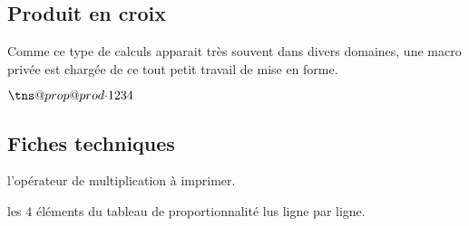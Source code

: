 \documentclass[12pt,a4paper]{article}
\begin{document}

\subsection{Produit en croix}

Comme ce type de calculs apparait très souvent dans divers domaines, une macro privée est chargée de ce tout petit travail de mise en forme.

\begin{latexex}
\makeatletter
$\tns@prop@prod{\cdot} %
               {1}{2}  %
               {3}{4}$ %
\makeatother
\end{latexex}




\subsection{Fiches techniques}



 l'opérateur de multiplication à imprimer.

 les $4$ éléments du tableau de proportionnalité lus ligne par ligne.
\end{document}
